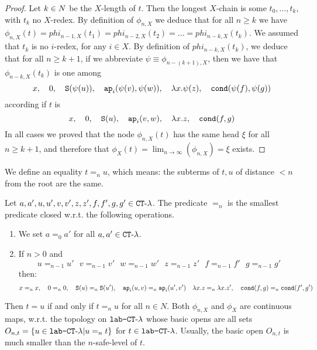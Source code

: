 \begin{proof}
Let $k\in {N}$ be the $X$-length of $t$. Then the longest $X$-chain is some $t_0, \ldots, t_k$,
with $t_k$ no $X$-redex.
By definition of $\phi_{n,X}$ we deduce that for all $n \ge k$ we have $\phi_{n,X}(t)
= phi_{n-1,X}(t_1) = phi_{n-2,X}(t_2) = \ldots = phi_{n-k,X}(t_k)$. 
We assumed that $t_k$ is no $i$-redex, for any $i \in X$.
By definition of $phi_{n-k,X}(t_k)$, 
we deduce that for all $n \ge k+1$, if we abbreviate $\psi \equiv \phi_{n-(k+1),X}$, then
we have that $\phi_{n-k,X}(t_k)$ is one among
$$ 
x, \ \ \  
0, \ \ \  
{\tt S}(\psi(u)),  \ \ \  
{\tt ap}_i(\psi(v), \psi(w)), \ \ \  
\lambda x.\psi(z), \ \ \  
{\tt cond}(\psi(f), \psi(g))
$$
according if $t$ is
$$ 
x, \ \ \  
0, \ \ \  
{\tt S}(u),  \ \ \  
{\tt ap}_i(v,w), \ \ \  
\lambda x.z, \ \ \  
{\tt cond}(f,g)
$$
In all cases we proved that the node $\phi_{n,X}(t)$ has the same head $\xi$ for all $n \ge k+1$,
and therefore that $\phi_X(t) = \lim_{n \rightarrow \infty}(\phi_{n,X}) = \xi$ exists.
\end{proof}


We define an equality $t =_n u$, which means: the subterms of $t,u$ of distance $<n$ from the root are the
same.

\begin{definition}[$n$-equality on Terms of $\CTlambda$]
Let $a,a',u,u',v,v',z,z',f,f',g,g' \in { {\tt CT}\mbox{-}\lambda}$. 
The predicate $=_n$ is the smallest predicate closed w.r.t. the following operations.

\begin{enumerate}


\item
We set
$a=_0 a'$ for all $a,a' \in { {\tt CT}\mbox{-}\lambda}$. 
\item
If $n>0$ and
$$
u=_{n-1} u' \ \ \ v=_{n-1} v' \ \ \ w=_{n-1} w' \ \ \ z=_{n-1} z' \ \ \ f=_{n-1} f' \ \ \ g=_{n-1} g'
$$
then:
$$
x=_{n} x, \ \ \  
0=_{n} 0, \ \ \   
\Succ(u)=_{n} \Succ(u'), \ \ \ 
\ap_i(u,v) =_{n} \ap_i(u',v') \ \ \  
\lambda x.z =_{n} \lambda x.z', \ \ \ 
\cond(f,g) =_{n} \cond(f',g')
$$

\end{enumerate}
\end{definition}

Then $t=u$ if and only if $t=_n u$ for all $n \in N$.
Both $\phi_{n,X}$ and $\phi_X$ are continuous maps, w.r.t. the topology on ${\mbox{\tt lab-}{ {\tt CT}\mbox{-}\lambda}}$
whose basic opens are all sets 
$O_{n,t} = \{u \in {\mbox{\tt lab-} { {\tt CT}\mbox{-}\lambda} } | u =_{n} t\}$  for $t \in {\mbox{\tt lab-} { {\tt CT}\mbox{-}\lambda} }$.
Usually,  the basic open $O_{n,t}$ is much smaller than the $n$-safe-level of $t$. 

